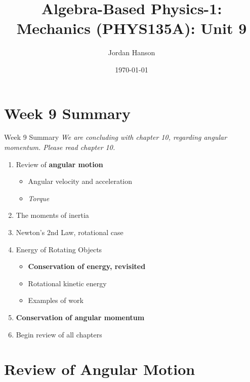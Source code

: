 \documentclass{beamer}
\title{Algebra-Based Physics-1: Mechanics (PHYS135A): Unit 9}
\date{\today}
\author{Jordan Hanson}
\institute{Whittier College Department of Physics and Astronomy}
\begin{document}
\maketitle

\section{Week 9 Summary}

\begin{frame}{Week 9 Summary}
\textit{We are concluding with chapter 10, regarding angular momentum. Please read chapter 10.}
\begin{enumerate}
\item Review of \textbf{angular motion}
\begin{itemize}
\item Angular velocity and acceleration
\item \textit{Torque}
\end{itemize}
\item \alert{The moments of inertia}
\item Newton's 2nd Law, rotational case
\item Energy of Rotating Objects
\begin{itemize}
\item \textbf{Conservation of energy, revisited}
\item Rotational kinetic energy
\item Examples of work
\end{itemize}
\item \textbf{\alert{Conservation of angular momentum}}
\item Begin review of all chapters
\end{enumerate}
\end{frame}

\section{Review of Angular Motion}
\end{document}
